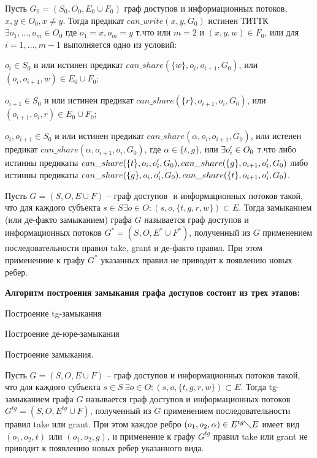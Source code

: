 \begin{proofs}
	Пусть $G_0 = (S_0, O_0, E_0 \cup F_0)$ граф доступов и информационных потоков, $x,y \in O_0, x \neq y.$
	Тогда предикат $can\_write(x,y,G_0)$ истинен ТИТТК $\exists o_1, \ldots, o_m \in O_0$ где 
	$o_1 = x, o_m = y$ т.что или $m = 2$ и $(x,y,w) \in F_0$, или для $i = 1, \ldots, m-1$ выполняется одно из условий:
	\begin{itemize*}
		\item $o_i \in S_0$ и или истинен предикат $can\_share(\{w\}, o_i, o_{i+1}, G_0)$, или $(o_i, o_{i+1}, w) \in E_0 \cup F_0$;
		\item $o_{i+1} \in S_0$ и или истинен предикат $can\_share(\{r\}, o_{i+1}, o_i, G_0)$, или $(o_{i+1}, o_i, r) \in E_0 \cup F_0$;
		\item $o_i,o_{i+1} \in S_0$ и или истинен предикат $can\_share(\alpha, o_i, o_{i+1}, G_0)$, или истенен предикат $can\_share(\alpha, o_{i+1}, o_i, G_0)$, где 
		$\alpha \in \{t,g\}$, или $\exists o_i^{\prime} \in O_0$ т.что либо истинны предикаты $can\_share(\{t\}, o_i, o_i^{\prime}, G_0), can\_share(\{g\}, o_{i+1}, o_i^{\prime}, G_0)$
		либо истинны предикаты $can\_share(\{g\}, o_i, o_i^{\prime}, G_0), can\_share(\{t\}, o_{i+1}, o_i^{\prime}, G_0)$.
	\end{itemize*}
\end{proofs}

\begin{defs}
	Пусть $G = (S, O, E \cup F)$ -- граф доступов $ $ и информационных потоков такой, что для каждого субъекта 
	$s \in S \exists o \in O : (s,o,\{t,g,r,w\}) \subset E$. Тогда замыканием (или де-факто замыканием)
	графа $G$ называется граф доступов и информационных потоков $G^* = (S, O, E^* \cup F^*)$, полученный 
	из $G$ применением последовательности правил take, grant и де-факто правил. При этом применениие к 
	графу $G^*$ указанных правил не приводит к появлению новых ребер.
\end{defs}

\textbf{Алгоритм построения замыкания графа доступов состоит из трех этапов:}
\begin{enumerate*}
	\item Построение tg-замыкания
	\item Построение де-юре-замыкания
	\item Построение замыкания.
\end{enumerate*}

\begin{defs}
	Пусть $G = (S, O, E \cup F)$ -- граф доступов и информационных потоков такой, что для каждого субъекта 
	$s \in S \ \exists o \in O : (s,o,\{t,g,r,w\}) \subset E$. Тогда tg-замыканием 
	графа $G$ называется граф доступов и информационных потоков $G^{tg} = (S, O, E^{tg} \cup F)$, полученный 
	из $G$ применением последовательности правил take или grant. При этом каждое ребро $(o_1, o_2, \alpha) 
	\in E^{tg} \diagdown E$ имеет вид $(o_1, o_2, t)$ или $(o_1, o_2, g)$, и применение к графу $G^{tg}$ правил 
	take или grant не приводит к появлению новых ребер указанного вида.
\end{defs}

